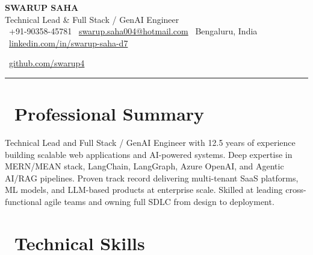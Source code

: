 \documentclass[10pt, letterpaper]{article}
\newcommand{\contactitem}[2]{%
  {\color{accent}#1}\ {\color{textmuted}\fontsize{9}{11}\selectfont #2}%
}
\begin{document}

\begin{center}
  {\fontsize{24}{28}\bfseries\color{accent} SWARUP SAHA}\\[4pt]
  {\fontsize{11}{13}\color{textmuted} Technical Lead \& Full Stack / GenAI Engineer}\\[6pt]
  \contactitem{\faPhone}{+91-90358-45781}\enspace
  \contactitem{\faEnvelope}{\href{mailto:swarup.saha004@hotmail.com}{swarup.saha004@hotmail.com}}\enspace
  \contactitem{\faMapMarker*}{Bengaluru, India}\enspace
  \contactitem{\faLinkedin}{\href{https://linkedin.com/in/swarup-saha-d7}{linkedin.com/in/swarup-saha-d7}}\enspace
  
  \contactitem{\faGithub}{\href{https://github.com/swarup4}{github.com/swarup4}}
\end{center}

\vspace{-2pt}
\textcolor{accent}{\rule{\linewidth}{1pt}}
\vspace{0pt}

\section{\faUser\ Professional Summary}

{\fontsize{9}{13}\color{textmain}
  Technical Lead and Full Stack / GenAI Engineer with 12.5 years of experience building scalable
  web applications and AI-powered systems. Deep expertise in MERN/MEAN stack, LangChain,
  LangGraph, Azure OpenAI, and Agentic AI/RAG pipelines. Proven track record delivering
  multi-tenant SaaS platforms, ML models, and LLM-based products at enterprise scale. Skilled
  at leading cross-functional agile teams and owning full SDLC from design to deployment.
}

\section{\faCogs\ Technical Skills}
\end{document}
